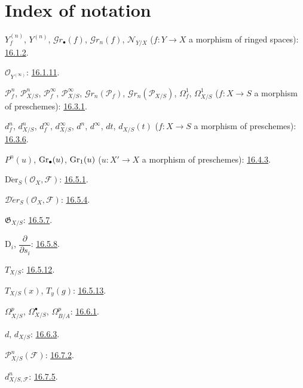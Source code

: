 \clearpage
{}
{}
\section*{Index of notation}

\begingroup
\small
\setlength{\parindent}{0pt}
\setlength{\parskip}{1.5pt}
\newcommand{\EGAIVidxref}[1]{\hyperref[IV.#1]{#1}}

$Y_f^{(n)}$, $Y^{(n)}$, $\mathcal{G}r_{\bullet}(f)$,
$\mathcal{G}r_n(f)$, $\mathcal{N}_{Y/X}$
($f:Y\to X$ a morphism of ringed spaces): {\hyperref[section:IV.16]{16.1.2}}.

$\mathcal{O}_{Y^{(\infty)}}$: {\hyperref[section:IV.16]{16.1.11}}.

$\mathcal{P}^{n}_{f}$, $\mathcal{P}^{n}_{X/S}$,
$\mathcal{P}^{\infty}_{f}$, $\mathcal{P}^{\infty}_{X/S}$, $\mathcal{G}r_n(\mathcal{P}_f)$, $\mathcal{G}r_n(\mathcal{P}_{X/S})$,
$\varOmega^{1}_{f}$, $\varOmega^{1}_{X/S}$
($f:X\to S$ a morphism of preschemes): {\hyperref[section:IV.16]{16.3.1}}.

$d^{n}_{f}$, $d^{n}_{X/S}$, $d^{\infty}_{f}$,
$d^{\infty}_{X/S}$, $d^{n}$, $d^{\infty}$, $dt$, $d_{X/S}(t)$
($f:X\to S$ a morphism of preschemes): {\hyperref[section:IV.16]{16.3.6}}.

$P^{n}(u)$, $\operatorname{Gr}_{\bullet}(u)$, $\operatorname{Gr}_{1}(u)$
($u:X'\to X$ a morphism of preschemes): {\hyperref[IV.16.4.3]{16.4.3}}.

$\operatorname{D\acute{e}r}_{S}(\mathcal{O}_{X},\mathcal{F})$:
{\hyperref[section:IV.16]{16.5.1}}.

$\mathcal{D}\acute{e}r_{S}(\mathcal{O}_{X},\mathcal{F})$:
{\hyperref[section:IV.16]{16.5.4}}.

$\mathfrak{G}_{X/S}$: {\hyperref[section:IV.16]{16.5.7}}.

$\mathrm{D}_i$, $\dfrac{\partial}{\partial s_i}$: {\hyperref[IV.16.5.8]{16.5.8}}.

$T_{X/S}$: {\hyperref[section:IV.16]{16.5.12}}.

$T_{X/S}(x)$, $T_y(g)$: {\hyperref[section:IV.16]{16.5.13}}.

$\varOmega^p_{X/S}$, $\varOmega^\bullet_{X/S}$, $\Omega^p_{B/A}$:
{\hyperref[section:IV.16]{16.6.1}}.

$d$, $d_{X/S}$: {\hyperref[section:IV.16]{16.6.3}}.

$\mathcal{P}^n_{X/S}(\mathcal{F})$: {\hyperref[IV.16.7.2]{16.7.2}}.

$d^n_{X/S,\mathcal{F}}$: {\hyperref[IV.16.7.5]{16.7.5}}.

